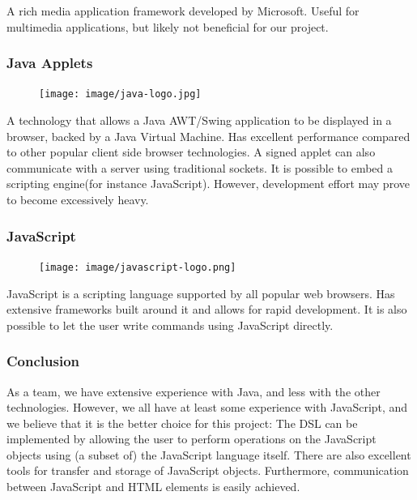 A rich media application framework developed by Microsoft. Useful for multimedia applications, but likely not beneficial for our project.

\subsubsection{Java Applets}

\begin{figure}
\vspace{-30pt}
\centering
\texttt{[image: image/java-logo.jpg]}
\end{figure}

A technology that allows a Java AWT/Swing application to be displayed in a browser, backed by a Java Virtual Machine. Has excellent performance compared to other popular client side browser technologies. A signed applet can also communicate with a server using traditional sockets. It is possible to embed a scripting engine(for instance JavaScript). However, development effort may prove to become excessively heavy.

\subsubsection{JavaScript}

\begin{figure}
\vspace{-20pt}
\centering
\texttt{[image: image/javascript-logo.png]}
\end{figure}


JavaScript is a scripting language supported by all popular web browsers. Has extensive frameworks built around it and allows for rapid development. It is also possible to let the user write commands using JavaScript directly.

\subsubsection{Conclusion}
As a team, we have extensive experience with Java, and less with the other technologies. However, we all have at least some experience with JavaScript, and we believe that it is the better choice for this project: The DSL can be implemented by allowing the user to perform operations on the JavaScript objects using (a subset of) the JavaScript language itself. There are also excellent tools for transfer and storage of JavaScript objects. Furthermore, communication between JavaScript and HTML elements is easily achieved.

